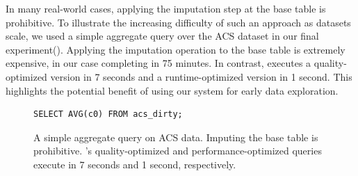 In many real-world cases, applying the imputation step at the base table is prohibitive.
To illustrate the increasing difficulty of such an approach as datasets scale, we used a simple
aggregate query over the ACS dataset in our final experiment().
Applying the imputation operation to the base table is extremely expensive, in our case
completing in 75 minutes. In contrast, \ProjectName{} executes a quality-optimized version
in 7 seconds and a runtime-optimized version in 1 second. This highlights the potential
benefit of using our system for early data exploration.

\begin{figure}
\begin{lstlisting}
SELECT AVG(c0) FROM acs_dirty;
\end{lstlisting}
\caption{A simple aggregate query on ACS data. Imputing the base table is prohibitive.
    \ProjectName's quality-optimized and performance-optimized queries execute in 7 seconds
    and 1 second, respectively.
}
\label{query-acs}
\end{figure}


